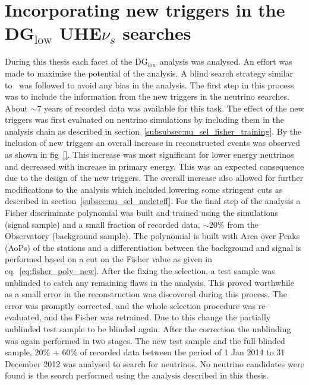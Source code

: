 \section*{Incorporating new triggers in the DG$\mathrm{_{low}}$ UHE$\nu_s$ searches}
During this thesis each facet of the DG$_{low}$ analysis was analysed. An effort was made to maximise the potential of the analysis. A blind search strategy similar to~\cite{gap_note_2013,Aab_2019_diffuse} was followed to avoid any bias in the analysis. The first step in this process was to include the information from the new triggers in the neutrino searches. About $\sim$7 years of recorded data was available for this task. The effect of the new triggers was first evaluated on neutrino simulations by including them in the analysis chain as described in section~\ref{subsubsec:nu_sel_fisher_training}. By the inclusion of new triggers an overall increase in reconstructed events was observed as shown in fig~\ref{}. This increase was most significant for lower energy neutrinos and decreased with increase in primary energy. This was an expected consequence due to the design of the new triggers. The overall increase also allowed for further modifications to the analysis which included lowering some stringent cuts as described in section~\ref{subsec:nu_sel_nudeteff}. For the final step of the analysis a Fisher discriminate polynomial was built and trained using the simulations (signal sample) and a small fraction of recorded data, $\sim$20\% from the Observatory (background sample). The polynomial is built with Area over Peaks (AoPs) of the stations and a differentiation between the background and signal is performed based on a cut on the Fisher value as given in eq.~\ref{eq:fisher_poly_new}. 
After the fixing the selection, a test sample was unblinded to catch any remaining flaws in the analysis. This proved worthwhile as a small error in the reconstruction was discovered during this process. The error was promptly corrected, and the whole selection procedure was re-evaluated, and the Fisher was retrained. Due to this change the partially unblinded test sample to be blinded again. After the correction the unblinding was again performed in two stages. The new test sample and the full blinded sample, 20\% + 60\% of recorded data between the period of 1 Jan 2014 to 31 December 2012 was analysed to search for neutrinos. No neutrino candidates were found is the search performed using the analysis described in this thesis. 

